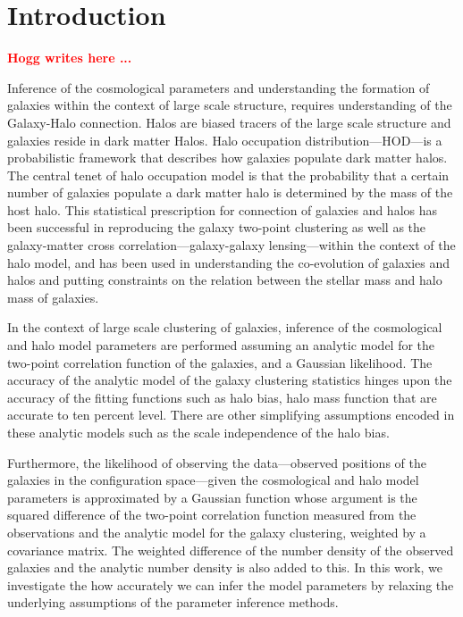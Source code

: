 \documentclass[12pt, preprint]{aastex}
\newcommand{\todo}[1]{{\bf \textcolor{red}{ #1}}}
\begin{document}
\section{Introduction}

\todo{Hogg writes here ...}

Inference of the cosmological parameters and understanding the formation of galaxies within the context of large scale 
structure, requires understanding of the Galaxy-Halo connection. Halos are biased tracers of the large scale structure 
and galaxies reside in dark matter Halos. Halo occupation distribution---HOD---is a probabilistic framework that describes how galaxies populate dark matter halos. The central tenet of halo occupation model is that the probability that a certain number of galaxies populate a dark matter halo is determined by the mass of the host halo. This statistical prescription for connection of galaxies and halos has been successful in reproducing the galaxy two-point clustering as well as the galaxy-matter cross correlation---galaxy-galaxy 
lensing---within the context of the halo model, and has been used in understanding the co-evolution of galaxies and halos and putting constraints on the relation between the stellar mass and halo mass of galaxies.

In the context of large scale clustering of galaxies, inference of the cosmological and halo model parameters are performed assuming an analytic model for the two-point correlation function of the galaxies, and a Gaussian likelihood. The accuracy of the analytic model of the galaxy clustering statistics hinges upon the accuracy of the fitting functions such as halo bias, halo mass function that are accurate to ten percent level. There are other simplifying assumptions encoded in these analytic models such as the scale independence of the halo bias. 

Furthermore, the likelihood of observing the data---observed positions of the galaxies in the configuration space---given the cosmological and halo model parameters is approximated by a Gaussian function whose argument is the squared difference of the two-point correlation function measured from the observations and the analytic model for the galaxy clustering, weighted by a covariance matrix. The weighted difference of the number density of the observed galaxies and the analytic number density is also added to this. In this work, we investigate the how accurately we can infer the model parameters by relaxing the underlying assumptions of the parameter inference methods. 
\end{document}

